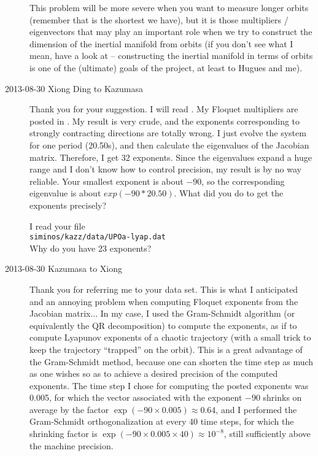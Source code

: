 \begin{description}
This problem will be more severe when you want to measure longer orbits
 (remember that  is the shortest we have),
 but it is those multipliers / eigenvectors that may play an important role
 when we try to construct the dimension of the inertial manifold from orbits
 (if you don't see what I mean, have a look at 
 -- constructing the inertial manifold in terms of orbits
 is one of the (ultimate) goals of the project, at least to Hugues and me).

 \item[2013-08-30 Xiong Ding to Kazumasa]
 Thank you for your suggestion. I will read .
 My Floquet multipliers are posted in . My result is
 very crude, and the exponents corresponding to strongly contracting directions
 are totally wrong. I just evolve the system for one period (20.50s), and then
 calculate the eigenvalues of the Jacobian matrix. Therefore, I get 32 exponents.
 Since the eigenvalues expand a huge range and I don't know how to control
 precision, my result is by no way reliable. Your smallest exponent is
 about $-90$, so the corresponding eigenvalue is about $exp(-90*20.50)$.
 What did you do to get the exponents precisely?

 I read your file \\
 \texttt{siminos/kazz/data/UPOa-lyap.dat}\\
 Why do you have 23 exponents?

\item[2013-08-30 Kazumasa to Xiong]
Thank you for referring me to your data set.
This is what I anticipated and an annoying problem
 when computing Floquet exponents from the Jacobian matrix...
In my case, I used the Gram-Schmidt algorithm
 (or equivalently the QR decomposition) to compute the exponents,
 as if to compute Lyapunov exponents of a chaotic trajectory
 (with a small trick to keep the trajectory ``trapped'' on the orbit).
This is a great advantage of the Gram-Schmidt method,
 because one can shorten the time step as much as one wishes
 so as to achieve a desired precision of the computed exponents.
The time step I chose for computing the posted exponents was 0.005,
 for which the vector associated with the exponent $-90$ shrinks
 on average by the factor $\exp(-90 \times 0.005) \approx 0.64$,
 and I performed the Gram-Schmidt orthogonalization
 at every 40 time steps, for which the shrinking factor is
 $\exp(-90 \times 0.005 \times 40) \approx 10^{-8}$,
 still sufficiently above the machine precision.


\end{description}
